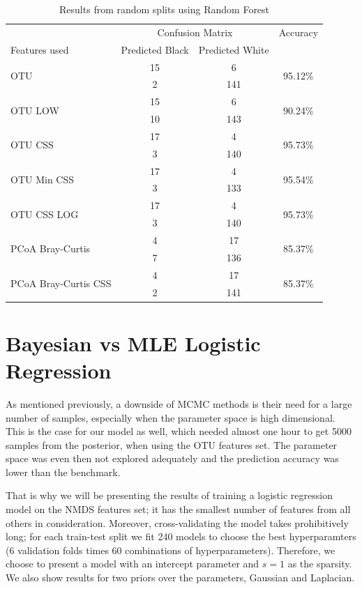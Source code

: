 \begin{table}[!htb]
	\centering
	\caption{Results from random splits using Random Forest}
	\label{table:rfrrandom}
	\begin{tabular}{l c  c c}
		\toprule
		&\multicolumn{2}{c}{Confusion Matrix} & Accuracy\\
		Features used & Predicted Black&Predicted White&\\
		\midrule
		\multirow{2}{*}{OTU} &15 &6&\multirow{2}{*}{95.12\%}\\
		&	2&141&\\
		\cmidrule{2-3}
		\multirow{2}{*}{OTU LOW} &15 &6&\multirow{2}{*}{90.24\%}\\
		&	10&143&\\
		\cmidrule{2-3}
		\multirow{2}{*}{OTU CSS}&17 &4&\multirow{2}{*}{95.73\%}\\
		&	 3&140&\\
		\cmidrule{2-3}
		\multirow{2}{*}{OTU Min CSS}&17 &4&\multirow{2}{*}{95.54\%}\\
		&	 3&133&\\
		\cmidrule{2-3}
		\multirow{2}{*}{OTU CSS LOG}&17 &4&\multirow{2}{*}{95.73\%}\\
		&	 3&140&\\
		\cmidrule{2-3}
		\multirow{2}{*}{PCoA Bray-Curtis} &4 &17&\multirow{2}{*}{85.37\%}\\
		&	 7&136&\\
		\cmidrule{2-3}
		\multirow{2}{*}{PCoA Bray-Curtis CSS} &4 &17&\multirow{2}{*}{85.37\%}\\
		&	 2&141&\\
		\bottomrule
	\end{tabular}
	
\end{table}

\section{Bayesian vs MLE Logistic Regression}
As mentioned previously, a downside of MCMC methods is their need for a large number of samples, especially when the parameter space is high dimensional. This is the case for our model as well, which needed almost one hour to get 5000 samples from the posterior, when using the OTU features set. The parameter space was even then not explored adequately and the prediction accuracy was lower than the benchmark. 


That is why we will be presenting the results of training a logistic regression model on the NMDS features set; it has the smallest number of features from all others in consideration. Moreover, cross-validating the model takes prohibitively long; for each train-test split we fit 240 models to choose the best hyperparamters (6 validation folds times 60 combinations of hyperparameters). Therefore, we choose to present a model with an intercept parameter and $s=1$ as the sparsity. We also show results for two priors over the parameters, Gaussian and Laplacian.

